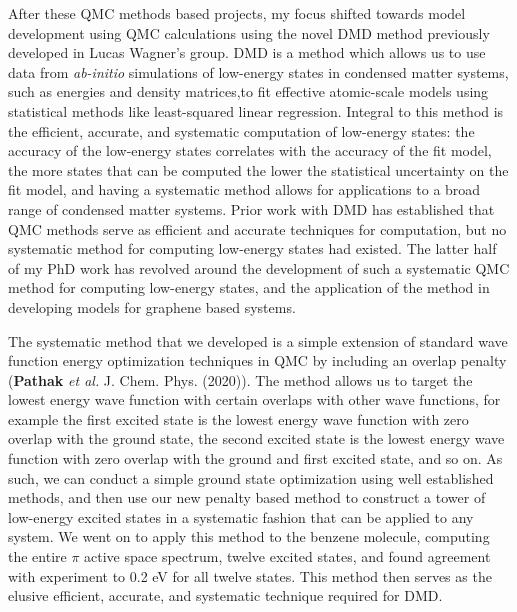 \documentclass{article}
\begin{document}
After these QMC methods based projects, my focus shifted towards model development using QMC calculations using the novel DMD method previously developed in Lucas Wagner's group.
DMD is a method which allows us to use data from \textit{ab-initio} simulations of low-energy states in condensed matter systems, such as energies and density matrices,to fit effective atomic-scale models using statistical methods like least-squared linear regression.
Integral to this method is the efficient, accurate, and systematic computation of low-energy states: the accuracy of the low-energy states correlates with the accuracy of the fit model,  the more states that can be computed the lower the statistical uncertainty on the fit model, and having a systematic method allows for applications to a broad range of condensed matter systems.
Prior work with DMD has established that QMC methods serve as efficient and accurate techniques for computation, but no systematic method for computing low-energy states had existed.
The latter half of my PhD work has revolved around the development of such a systematic QMC method for computing low-energy states, and the application of the method in developing models for graphene based systems.

The systematic method that we developed is a simple extension of standard wave function energy optimization techniques in QMC by including an overlap penalty (\textbf{Pathak} \textit{et al.} J. Chem. Phys. (2020)).
The method allows us to target the lowest energy wave function with certain overlaps with other wave functions, for example the first excited state is the lowest energy wave function with zero overlap with the ground state, the second excited state is the lowest energy wave function with zero overlap with the ground and first excited state, and so on.
As such, we can conduct a simple ground state optimization using well established methods, and then use our new penalty based method to construct a tower of low-energy excited states in a systematic fashion that can be applied to any system.
We went on to apply this method to the benzene molecule, computing the entire $\pi$ active space spectrum, twelve excited states, and found agreement with experiment to 0.2 eV for all twelve states.
This method then serves as the elusive efficient, accurate, and systematic technique required for DMD.
\end{document}
